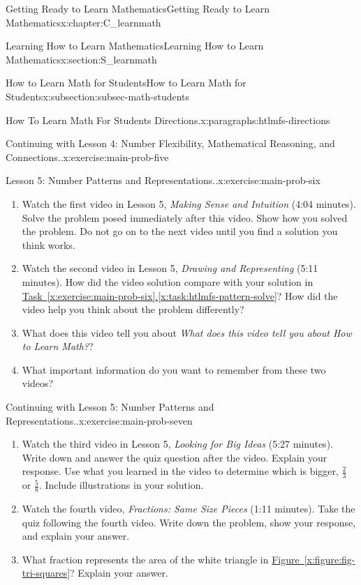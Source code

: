 \documentclass[oneside,10pt,]{book}
\newcommand{\xreffont}{\relax}
\newcommand{\pubtitle}[1]{\textsl{#1}}
\numberwithin{equation}{chapter}
\begin{document}
\begin{chapterptx}{Getting Ready to Learn Mathematics}{}{Getting Ready to Learn Mathematics}{}{}{x:chapter:C_learnmath}
\begin{sectionptx}{Learning How to Learn Mathematics}{}{Learning How to Learn Mathematics}{}{}{x:section:S_learnmath}
\begin{subsectionptx}{How to Learn Math for Students}{}{How to Learn Math for Students}{}{}{x:subsection:subsec-math-students}
\begin{paragraphs}{How To Learn Math For Students Directions.}{x:paragraphs:htlmfs-directions}
\begin{inlineexercise}{Continuing with Lesson 4: Number Flexibility, Mathematical Reasoning, and Connections..}{x:exercise:main-prob-five}
\begin{enumerate}[font=\bfseries,label=(\alph*),ref=\alph*]
\end{enumerate}
\end{inlineexercise}%
\begin{inlineexercise}{Lesson 5: Number Patterns and Representations..}{x:exercise:main-prob-six}%
\begin{enumerate}[font=\bfseries,label=(\alph*),ref=\alph*]
\item\label{x:task:htlmfs-pattern-solve}Watch the first video in Lesson 5, \pubtitle{Making Sense and Intuition} (4:04 minutes). Solve the problem posed immediately after this video. Show how you solved the problem. Do not go on to the next video until you find a solution you think works.%
\item{}Watch the second video in Lesson 5, \pubtitle{Drawing and Representing} (5:11 minutes). How did the video solution compare with your solution in \hyperref[x:task:htlmfs-pattern-solve]{Task~{\xreffont\ref{x:exercise:main-prob-six}}.{\xreffont\ref{x:task:htlmfs-pattern-solve}}}? How did the video help you think about the problem differently?%
\item{}What does this video tell you about \pubtitle{What does this video tell you about How to Learn Math?}?%
\item{}What important information do you want to remember from these two videos?%
\end{enumerate}
\end{inlineexercise}%
\begin{inlineexercise}{Continuing with Lesson 5: Number Patterns and Representations..}{x:exercise:main-prob-seven}%
\begin{enumerate}[font=\bfseries,label=(\alph*),ref=\alph*]
\item{}Watch the third video in Lesson 5, \pubtitle{Looking for Big Ideas} (5:27 minutes). Write down and answer the quiz question after the video. Explain your response. Use what you learned in the video to determine which is bigger, \(\frac{2}{3}\) or \(\frac{5}{8}\). Include illustrations in your solution.%
\item{}Watch the fourth video, \pubtitle{Fractions: Same Size Pieces} (1:11 minutes). Take the quiz following the fourth video. Write down the problem, show your response, and explain your answer.%
\item{}What fraction represents the area of the white triangle in \hyperref[x:figure:fig-tri-squares]{Figure~{\xreffont\ref{x:figure:fig-tri-squares}}}? Explain your answer.%

\end{enumerate}
\end{inlineexercise}
\end{paragraphs}
\end{subsectionptx}
\end{sectionptx}
\end{chapterptx}
\end{document}
